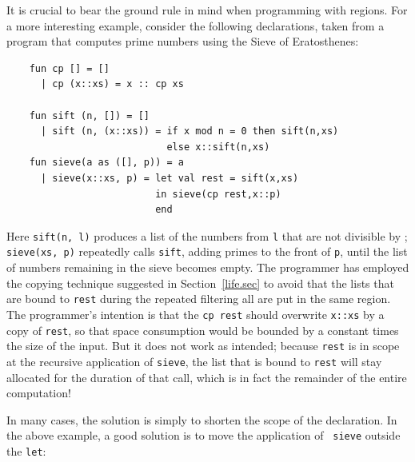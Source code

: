 \documentclass[12pt]{book}
\begin{document}
It is crucial to bear the ground rule in mind when programming with regions.
For a more interesting example, consider the following declarations, taken from a program that
computes prime numbers using the Sieve of Eratosthenes:
\begin{verbatim}
    fun cp [] = []
      | cp (x::xs) = x :: cp xs 

    fun sift (n, []) = []
      | sift (n, (x::xs)) = if x mod n = 0 then sift(n,xs)
                            else x::sift(n,xs)
    fun sieve(a as ([], p)) = a
      | sieve(x::xs, p) = let val rest = sift(x,xs)
                          in sieve(cp rest,x::p)
                          end
\end{verbatim}
Here {\tt sift(n, l)} produces a list of the numbers from {\tt l} that
are not divisible by ; {\tt sieve(xs, p)} repeatedly calls
{\tt sift}, adding primes to the front of {\tt p}, until the list of numbers
remaining in the sieve becomes empty. The programmer has employed the copying
technique suggested in Section~\ref{life.sec} to avoid that the 
lists that are bound to {\tt rest} during the repeated filtering
all are  put in the same region. The programmer's intention is that the
{\tt cp rest} should overwrite {\tt x::xs} by a copy of {\tt rest}, so
that space consumption would be bounded by a constant times the size of
the input.  But it does not work as intended; because {\tt rest}
is in scope at the recursive application of {\tt sieve}, the list that
is bound to {\tt rest} will stay
allocated for the duration of that call, which is in fact the remainder of
the entire computation! 

In many cases, the solution is simply to shorten the scope of the declaration. 
In the above example, a good solution is to move the application of {\tt
sieve} outside the {\tt let}:\pagebreak
\end{document}
